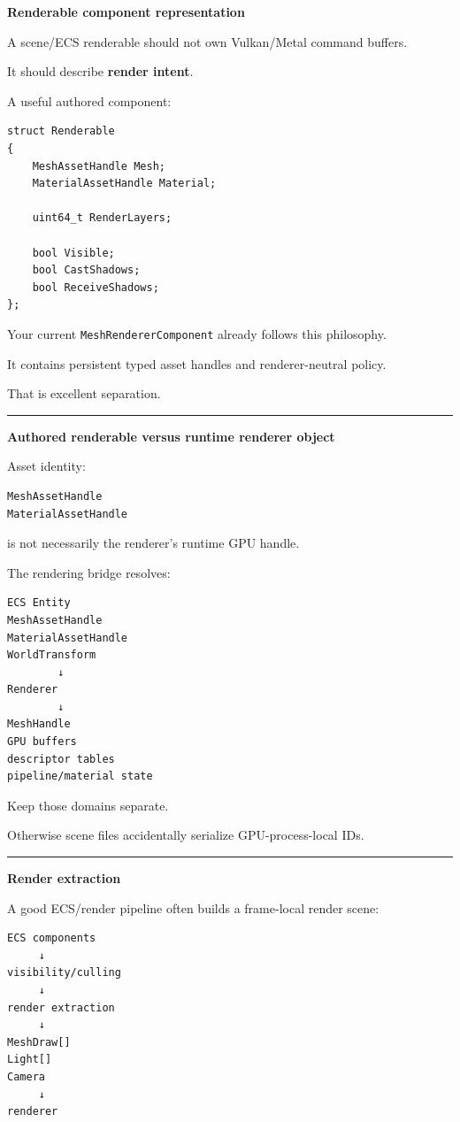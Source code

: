 \textbf{Renderable component representation}

A scene/ECS renderable should not own Vulkan/Metal command buffers.

It should describe \textbf{render intent}.

A useful authored component:

\begin{verbatim}
struct Renderable
{
    MeshAssetHandle Mesh;
    MaterialAssetHandle Material;

    uint64_t RenderLayers;

    bool Visible;
    bool CastShadows;
    bool ReceiveShadows;
};
\end{verbatim}

Your current \texttt{MeshRendererComponent} already follows this philosophy.

It contains persistent typed asset handles and renderer-neutral policy.

That is excellent separation.

\begin{center}\rule{0.5\linewidth}{0.5pt}\end{center}

\textbf{Authored renderable versus runtime renderer object}

Asset identity:

\begin{verbatim}
MeshAssetHandle
MaterialAssetHandle
\end{verbatim}

is not necessarily the renderer's runtime GPU handle.

The rendering bridge resolves:

\begin{verbatim}
ECS Entity
MeshAssetHandle
MaterialAssetHandle
WorldTransform
        ↓
Renderer
        ↓
MeshHandle
GPU buffers
descriptor tables
pipeline/material state
\end{verbatim}

Keep those domains separate.

Otherwise scene files accidentally serialize GPU-process-local IDs.

\begin{center}\rule{0.5\linewidth}{0.5pt}\end{center}

\textbf{Render extraction}

A good ECS/render pipeline often builds a frame-local render scene:

\begin{verbatim}
ECS components
     ↓
visibility/culling
     ↓
render extraction
     ↓
MeshDraw[]
Light[]
Camera
     ↓
renderer
\end{verbatim}

